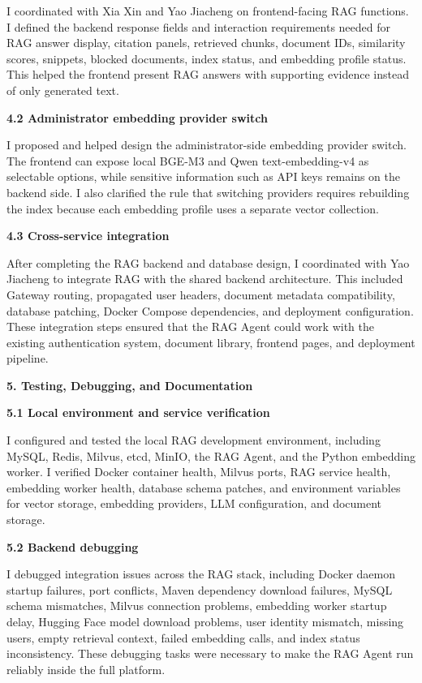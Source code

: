 I coordinated with Xia Xin and Yao Jiacheng on frontend-facing RAG functions. I defined the backend response fields and interaction requirements needed for RAG answer display, citation panels, retrieved chunks, document IDs, similarity scores, snippets, blocked documents, index status, and embedding profile status. This helped the frontend present RAG answers with supporting evidence instead of only generated text.

\textbf{4.2 Administrator embedding provider switch}

I proposed and helped design the administrator-side embedding provider switch. The frontend can expose local BGE-M3 and Qwen text-embedding-v4 as selectable options, while sensitive information such as API keys remains on the backend side. I also clarified the rule that switching providers requires rebuilding the index because each embedding profile uses a separate vector collection.

\textbf{4.3 Cross-service integration}

After completing the RAG backend and database design, I coordinated with Yao Jiacheng to integrate RAG with the shared backend architecture. This included Gateway routing, propagated user headers, document metadata compatibility, database patching, Docker Compose dependencies, and deployment configuration. These integration steps ensured that the RAG Agent could work with the existing authentication system, document library, frontend pages, and deployment pipeline.

\textbf{5. Testing, Debugging, and Documentation}

\textbf{5.1 Local environment and service verification}

I configured and tested the local RAG development environment, including MySQL, Redis, Milvus, etcd, MinIO, the RAG Agent, and the Python embedding worker. I verified Docker container health, Milvus ports, RAG service health, embedding worker health, database schema patches, and environment variables for vector storage, embedding providers, LLM configuration, and document storage.

\textbf{5.2 Backend debugging}

I debugged integration issues across the RAG stack, including Docker daemon startup failures, port conflicts, Maven dependency download failures, MySQL schema mismatches, Milvus connection problems, embedding worker startup delay, Hugging Face model download problems, user identity mismatch, missing users, empty retrieval context, failed embedding calls, and index status inconsistency. These debugging tasks were necessary to make the RAG Agent run reliably inside the full platform.

